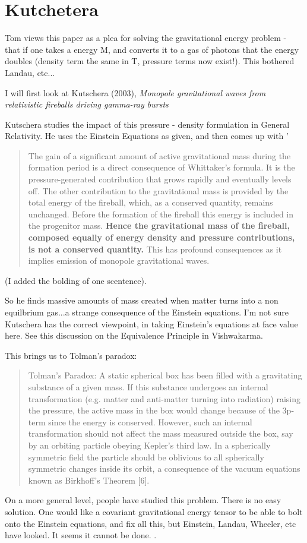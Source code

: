 \documentclass[../rzero]{subfiles}
\begin{document}
\section{Kutchetera}
Tom views this paper as a plea for solving the gravitational energy problem - that if one takes a energy M, and converts it to a gas of photons that the energy doubles (density term the same in T, pressure terms now exist!). This bothered Landau, etc... 

 

I will first look at Kutschera (2003)\cite{Kutschera2003}, \textit{Monopole gravitational waves from relativistic fireballs driving gamma-ray bursts}

Kutschera studies the impact of this pressure - density formulation in General Relativity. He uses the Einstein Equations as given, and then comes up with '
\begin{quotation}
		The gain of a significant amount of active gravitational mass during the formation period is a direct consequence of Whittaker's formula. It is the pressure-generated contribution that grows rapidly and eventually levels off. The other contribution to the gravitational mass is provided by the total energy of the fireball, which, as a conserved quantity, remains unchanged. Before the formation of the fireball this energy is included in the progenitor mass. \textbf{Hence the gravitational mass of the fireball, composed equally of energy density and pressure contributions, is not a conserved quantity.} This has profound consequences as it implies emission of monopole gravitational waves.
\end{quotation} (I added the bolding of one scentence).

So he finds massive amounts of mass created when matter turns into a non equilbrium gas...a strange consequence of the Einstein equations. I'm not sure Kutschera has the correct viewpoint, in taking Einstein's equations at face value here. See this discussion on the Equivalence Principle in Vishwakarma\cite{vishwakarmaEinsteinCriticalPerspective2016}.

This brings us to Tolman's paradox:
\begin{quotation}
	Tolman’s Paradox: A static spherical box has been filled with a gravitating substance of a given mass. If this substance undergoes an internal transformation (e.g. matter and anti-matter turning into radiation) raising the pressure, the active mass in the box would change because of the 3p-term since the energy is conserved. However, such an internal transformation should not affect the mass measured outside the box, say by an orbiting particle obeying Kepler’s third law. In a spherically symmetric field the particle should be oblivious to all spherically symmetric changes inside its orbit, a consequence of the vacuum equations known as Birkhoff’s Theorem [6].
\end{quotation}


On a more general level, people have studied this problem. There is no easy solution. One would like a covariant gravitational energy tensor to be able to bolt onto the Einstein equations, and fix all this, but Einstein, Landau, Wheeler, etc have looked. It seems it cannot be done.  \cite{08092323EnergyMomentumGravitational}. 
\end{document}
